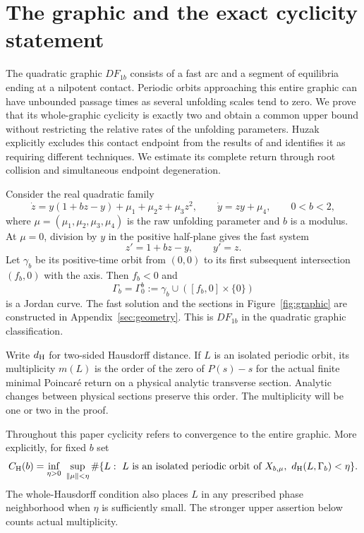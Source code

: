 \section{The graphic and the exact cyclicity statement}
\label{sec:introduction}
The quadratic graphic $DF_{1b}$ consists of a fast arc and a segment
of equilibria ending at a nilpotent contact. Periodic orbits approaching
this entire graphic can have unbounded passage times as several unfolding
scales tend to zero. We prove that its whole-graphic cyclicity is exactly
two and obtain a common upper bound without restricting the relative
rates of the unfolding parameters.
Huzak explicitly excludes this contact endpoint from the results of
\cite[Remark~2, p.~1307]{Huzak2018} and identifies it as requiring
different techniques. We estimate its complete return through root
collision and simultaneous endpoint degeneration.

Consider the real quadratic family
\begin{equation}\label{eq:family}
 \dot z=y(1+bz-y)+\mu_1+\mu_2z+\mu_3z^2,\qquad
 \dot y=zy+\mu_4,\qquad 0<b<2,
\end{equation}
where $\mu=(\mu_1,\mu_2,\mu_3,\mu_4)$ is the raw unfolding parameter
and $b$ is a modulus. At $\mu=0$, division by $y$ in the positive
half-plane gives the fast system
\begin{equation}\label{eq:fast}
 z'=1+bz-y,\qquad y'=z.
\end{equation}
Let $\gamma_b$ be its positive-time orbit from $(0,0)$ to its first
subsequent intersection $(f_b,0)$ with the axis. Then $f_b<0$ and
\begin{equation}\label{eq:graphic}
 \Gamma_b=\Gamma_0^b:=\gamma_b\cup([f_b,0]\times\{0\})
\end{equation}
is a Jordan curve. The fast solution and the sections in Figure~\ref{fig:graphic}
are constructed in Appendix~\ref{sec:geometry}.
This is $DF_{1b}$ in the quadratic graphic classification.

Write $d_{\rm H}$ for two-sided Hausdorff distance. If $L$ is an isolated
periodic orbit, its multiplicity $m(L)$ is the order of the zero of
$P(s)-s$ for the actual finite minimal Poincar\'e return on a physical
analytic transverse section. Analytic changes between physical sections
preserve this order. The multiplicity will be one or two in the proof.

Throughout this paper cyclicity refers to convergence to the entire
graphic. More explicitly, for fixed $b$ set
\[
 C_{\rm H}(b)=\inf_{\eta>0}\
 \sup_{\|\mu\|<\eta}
 \#\{L:\ L\text{ is an isolated periodic orbit of }X_{b,\mu},
                         \ d_{\rm H}(L,\Gamma_b)<\eta\}.
\]
The whole-Hausdorff condition also places $L$ in any prescribed
phase neighborhood when $\eta$ is sufficiently small.
The stronger upper assertion below counts actual multiplicity.

